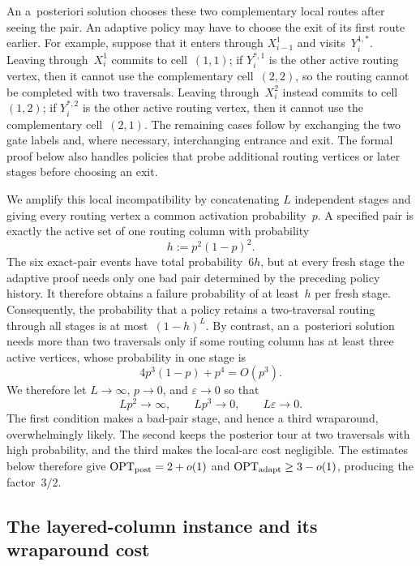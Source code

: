 \documentclass[12pt,a4paper,oneside]{report}
\begin{document}
An a~posteriori solution chooses these two complementary local routes after
seeing the pair.  An adaptive policy may have to choose the exit of its first
route earlier.  For example, suppose that it enters through
$X_{i-1}^1$ and visits~$Y_i^{1,\ast}$.  Leaving through~$X_i^1$ commits to
cell~$(1,1)$; if $Y_i^{\ast,1}$ is the other active routing vertex, then it
cannot use the complementary cell~$(2,2)$, so the routing cannot be completed
with two traversals.  Leaving through~$X_i^2$ instead commits to cell~$(1,2)$;
if $Y_i^{\ast,2}$ is the other active routing vertex, then it cannot use the
complementary cell~$(2,1)$.  The remaining cases follow by exchanging the two
gate labels and, where necessary, interchanging entrance and exit.  The
formal proof below also handles policies that probe
additional routing vertices or later stages before choosing an exit.

We amplify this local incompatibility by concatenating $L$ independent
stages and giving every routing vertex a common activation probability~$p$.
A specified pair is exactly the active set of one routing column with
probability
\[
    h:=p^2(1-p)^2.
\]
The six exact-pair events have total probability~$6h$, but at every fresh
stage the adaptive proof needs only one bad pair determined by the preceding
policy history.  It therefore obtains a failure probability of at least~$h$
per fresh stage.  Consequently, the probability that a policy retains a
two-traversal routing through all stages is at most~$(1-h)^L$.
By contrast, an a~posteriori solution needs more than two traversals only if
some routing column has at least three active vertices, whose probability in
one stage is
\[
    4p^3(1-p)+p^4=O(p^3).
\]
We therefore let $L\to\infty$, $p\to0$, and $\varepsilon\to0$ so that
\[
    Lp^2\to\infty,
    \qquad
    Lp^3\to0,
    \qquad
    L\varepsilon\to0.
\]
The first condition makes a bad-pair stage, and hence a third wraparound,
overwhelmingly likely.  The second keeps the posterior tour at two traversals
with high probability, and the third makes the local-arc cost negligible.
The estimates below therefore give $\operatorname{OPT}_\mathrm{post}=2+o(1)$ and
$\operatorname{OPT}_\mathrm{adapt}\ge3-o(1)$, producing the factor~$3/2$.

\subsection{The layered-column instance and its wraparound cost}
\label{sec:layered-column-instance}
\end{document}
